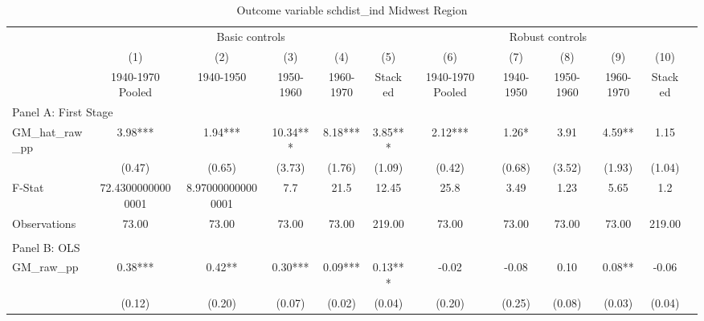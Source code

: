  \begin{table}[htbp]\centering {} \begin{threeparttable} \caption{Outcome variable schdist\_ind Midwest Region} \begin{tabular}{l*{11}{c}} \toprule
          &\multicolumn{5}{c}{Basic controls}                                   &\multicolumn{5}{c}{Robust controls}                                  \\\cmidrule(lr){2-6}\cmidrule(lr){7-11}
          &\multicolumn{1}{c}{(1)}&\multicolumn{1}{c}{(2)}&\multicolumn{1}{c}{(3)}&\multicolumn{1}{c}{(4)}&\multicolumn{1}{c}{(5)}&\multicolumn{1}{c}{(6)}&\multicolumn{1}{c}{(7)}&\multicolumn{1}{c}{(8)}&\multicolumn{1}{c}{(9)}&\multicolumn{1}{c}{(10)}\\
          &\multicolumn{1}{c}{1940-1970 Pooled}&\multicolumn{1}{c}{1940-1950}&\multicolumn{1}{c}{1950-1960}&\multicolumn{1}{c}{1960-1970}&\multicolumn{1}{c}{Stacked}&\multicolumn{1}{c}{1940-1970 Pooled}&\multicolumn{1}{c}{1940-1950}&\multicolumn{1}{c}{1950-1960}&\multicolumn{1}{c}{1960-1970}&\multicolumn{1}{c}{Stacked}\\
\cmidrule(lr){1-11}
\multicolumn{10}{l}{Panel A: First Stage}\\
\cmidrule(lr){1-11}
GM\_hat\_raw\_pp&      3.98***&      1.94***&     10.34***&      8.18***&      3.85***&      2.12***&      1.26*  &      3.91   &      4.59** &      1.15   \\
          &    (0.47)   &    (0.65)   &    (3.73)   &    (1.76)   &    (1.09)   &    (0.42)   &    (0.68)   &    (3.52)   &    (1.93)   &    (1.04)   \\
\midrule
F-Stat    &72.43000000000001   &8.970000000000001   &       7.7   &      21.5   &     12.45   &      25.8   &      3.49   &      1.23   &      5.65   &       1.2   \\
Observations&     73.00   &     73.00   &     73.00   &     73.00   &    219.00   &     73.00   &     73.00   &     73.00   &     73.00   &    219.00   \\
\cmidrule[\heavyrulewidth](lr){1-11} \\ \cmidrule[\heavyrulewidth](lr){1-11}
\multicolumn{10}{l}{Panel B: OLS}\\
\cmidrule(lr){1-11}
GM\_raw\_pp &      0.38***&      0.42** &      0.30***&      0.09***&      0.13***&     -0.02   &     -0.08   &      0.10   &      0.08** &     -0.06   \\
          &    (0.12)   &    (0.20)   &    (0.07)   &    (0.02)   &    (0.04)   &    (0.20)   &    (0.25)   &    (0.08)   &    (0.03)   &    (0.04)   \\

\end{tabular}
\end{threeparttable}
\end{table}
